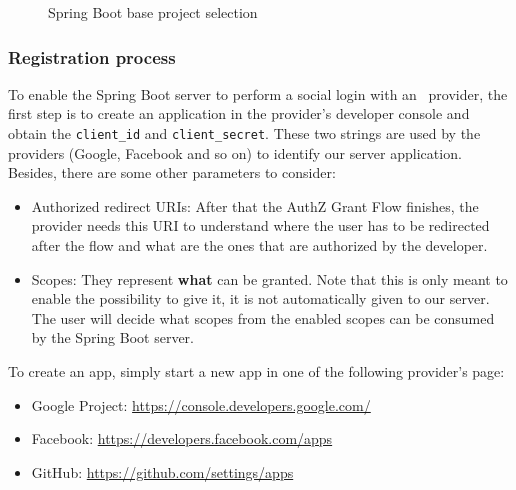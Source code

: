 \begin{figure}[h!]
    \centering
    \caption{Spring Boot base project selection}
    \label{fig:spring}
\end{figure}

\subsubsection{Registration process}
To enable the Spring Boot server to perform a social login with an \oauth\ provider, the first step is to create an application in the provider's developer console and obtain the \texttt{client\_id} and \texttt{client\_secret}. These two strings are used by the providers (Google, Facebook and so on) to identify our server application. Besides, there are some other parameters to consider:

\begin{itemize}
    \item Authorized redirect URIs: After that the AuthZ Grant Flow finishes, the provider needs this URI to understand where the user has to be redirected after the flow and what are the ones that are authorized by the developer.
    \item Scopes: They represent \textbf{what} can be granted. Note that this is only meant to enable the possibility to give it, it is not automatically given to our server. The user will decide what scopes from the enabled scopes can be consumed by the Spring Boot server.
\end{itemize}

\noindent To create an app, simply start a new app in one of the following provider's page:

\begin{itemize}
    \item Google Project: \url{https://console.developers.google.com/}
    \item Facebook: \url{https://developers.facebook.com/apps}
    \item GitHub: \url{https://github.com/settings/apps}
\end{itemize}

